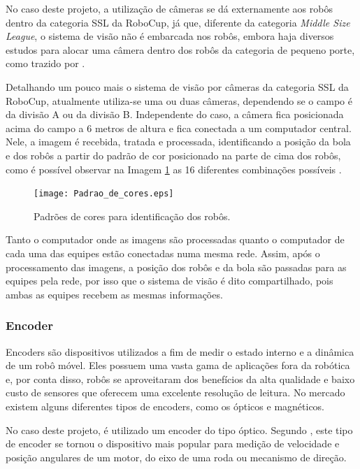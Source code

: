 \documentclass[acronym, symbols, table]{fei}
\begin{document}
				No caso deste projeto, a utilização de câmeras se dá externamente aos robôs dentro da categoria SSL da RoboCup, já que, diferente da categoria \textit{Middle Size League}, o sistema de visão não é embarcada nos robôs, embora haja diversos estudos para alocar uma câmera dentro dos robôs da categoria de pequeno porte, como trazido por \textcite{melo2022embedded}.
				
				Detalhando um pouco mais o sistema de visão por câmeras da categoria SSL da RoboCup, atualmente utiliza-se uma ou duas câmeras, dependendo se o campo é da divisão A ou da divisão B. Independente do caso, a câmera fica posicionada acima do campo a 6 metros de altura e fica conectada a um computador central. Nele, a imagem é recebida, tratada e processada, identificando a posição da bola e dos robôs a partir do padrão de cor posicionado na parte de cima dos robôs, como é possível observar na Imagem \ref{fig:color_patterns} as 16 diferentes combinações possíveis \cite{10.1007/978-3-642-11876-0_37}.
				
				\begin{figure}[!htb]
					\centering
					\caption{Padrões de cores para identificação dos robôs.} 
					\texttt{[image: Padrao\_de\_cores.eps]}
					\label{fig:color_patterns}
				\end{figure}
			
				Tanto o computador onde as imagens são processadas quanto o computador de cada uma das equipes estão conectadas numa mesma rede. Assim, após o processamento das imagens, a posição dos robôs e da bola são passadas para as equipes pela rede, por isso que o sistema de visão é dito compartilhado, pois ambas as equipes recebem as mesmas informações.
			
			\subsubsection{Encoder}
				
				Encoders são dispositivos utilizados a fim de medir o estado interno e a dinâmica de um robô móvel. Eles possuem uma vasta gama de aplicações fora da robótica e, por conta disso, robôs se aproveitaram dos benefícios da alta qualidade e baixo custo de sensores que oferecem uma excelente resolução de leitura. No mercado existem alguns diferentes tipos de encoders, como os ópticos e magnéticos. 
				
				No caso deste projeto, é utilizado um encoder do tipo óptico. Segundo \textcite{siegwart2011introduction}, este tipo de encoder se tornou o dispositivo mais popular para medição de velocidade e posição angulares de um motor, do eixo de uma roda ou mecanismo de direção.
				
\end{document}
